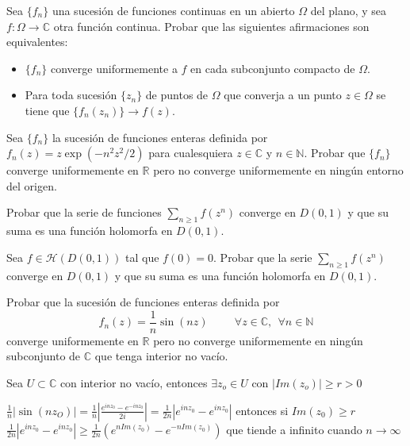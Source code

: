 \begin{ejer}
	Sea $\{f_n\}$ una sucesión de funciones continuas en un abierto $\Omega$ del plano, y sea $f:\Omega\rightarrow\mathbb{C}$ otra función continua. Probar que las siguientes afirmaciones son equivalentes:
	\begin{itemize}
		\item $\{f_n\}$ converge uniformemente a $f$ en cada subconjunto compacto de $\Omega$.
		\item Para toda sucesión $\{z_n\}$ de puntos de $\Omega$ que converja a un punto $z\in\Omega$ se tiene que $\{f_n(z_n)\}\rightarrow f(z)$.
	\end{itemize}
\end{ejer}

\begin{ejer}
	Sea $\{f_n\}$ la sucesión de funciones enteras definida por $f_n(z) = z\exp(-n^2z^2/2)$ para cualesquiera $z\in\mathbb{C}$ y $n\in\mathbb{N}$. Probar que $\{f_n\}$ converge uniformemente en $\mathbb{R}$ pero no converge uniformemente en ningún entorno del origen.
\end{ejer}

\begin{ejer}
	Probar que la serie de funciones $\sum_{n\geq 1} f(z^n)$ converge en $D(0,1)$ y que su suma es una función holomorfa en $D(0,1)$.
\end{ejer}

\begin{ejer}
	Sea $f\in\mathcal{H}(D(0,1))$ tal que $f(0)=0$.
	Probar que la serie $\sum_{n\geq 1}f(z^n)$ converge en $D(0,1)$ y que su suma es una función holomorfa en $D(0,1)$.
\end{ejer}

\begin{ejer}
	Probar que la sucesión de funciones enteras definida por
	$$ f_n(z) = \frac{1}{n}\sin(nz) \hspace{1cm} \forall z\in\mathbb{C}, \ \ \forall n\in\mathbb{N} $$
	converge uniformemente en $\mathbb{R}$ pero no converge uniformemente en ningún subconjunto de $\mathbb{C}$ que tenga interior no vacío.
\end{ejer}
\begin{sol}
Sea $U\subset \mathbb{C}$ con interior no vacío, entonces $\exists z_o\in U$ con $|Im(z_o)| \geq r > 0$

$\frac{1}{n}|\sin(nz_O)| = \frac{1}{n}\left| \frac{e^{inz_0}-e^{-inz_0}}{2i} \right|= \frac{1}{2n} \left| e^{inz_0} - e^{inz_0} \right| $
entonces si $Im(z_0)\geq r$
$\frac{1}{2n} \left| e^{inz_0} - e^{inz_0} \right|  \geq \frac{1}{2n} \left( e^{nIm(z_0)} -e^{-nIm(z_0)} \right)  $
que tiende a infinito cuando $n\rightarrow\infty$
\end{sol}

